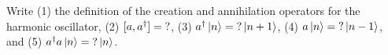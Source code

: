 

\vspace*{\fill}
\centering

Write (1) the definition of the creation and annihilation operators for the harmonic oscillator, (2) $[a,a^{\dagger}] = {\rm ?}$, (3) $a^{\dagger}\ket{n} = {\rm ?}\ket{n+1}$, (4) $a\ket{n} = {\rm ?}\ket{n-1}$, and (5) $a^{\dagger}a\ket{n} = {\rm ?}\ket{n}$.

\centering
\vspace*{\fill}

